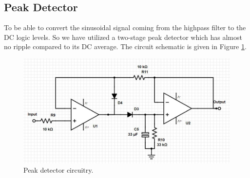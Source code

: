 \documentclass[a4paper,10pt]{IEEEtran}
\begin{document}
\subsection{Peak Detector}
To be able to convert the sinusoidal signal coming from the highpass filter to the DC logic levels. So we have utilized a two-stage peak detector which has almost no ripple compared to its DC average. The circuit schematic is given in Figure \ref{peak}.
\begin{figure}[htbp!]
    \centering
    \includegraphics[width = 1\linewidth]{Peak Detector.jpg}
    \caption{Peak detector circuitry.}
    \label{peak}
\end{figure} 
\end{document}

